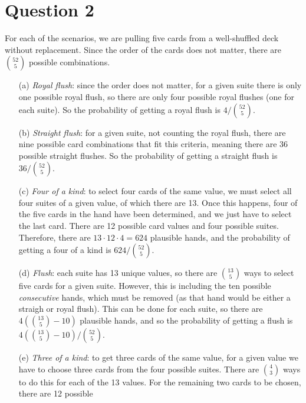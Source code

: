 \documentclass[10pt]{article}
\begin{document}
\section{Question 2} \noindent
For each of the scenarios, we are pulling five cards from a well-shuffled deck without replacement. Since the order of the cards does 
not matter, there are \(\binom{52}{5}\) possible combinations. 
\begin{itemize}
    \item[(a)] \textsl{Royal flush}: since the order does not matter, for a given suite there is only one possible royal flush, so there are 
    only four possible royal flushes (one for each suite). So the probability of getting a royal flush is \(4 / \binom{52}{5}\).
    \item[(b)] \textsl{Straight flush}: for a given suite, not counting the royal flush, there are nine possible card combinations that fit 
    this criteria, meaning there are 36 possible straight flushes. So the probability of getting a straight flush is \(36 / \binom{52}{5}\).
    \item[(c)] \textsl{Four of a kind}: to select four cards of the same value, we must select all four suites of a given value, of which there
    are 13. Once this happens, four of the five cards in the hand have been determined, and we just have to select the last card. There are 12 
    possible card values and four possible suites. Therefore, there are \(13\cdot12\cdot4 = 624\) plausible hands, and the probability of getting 
    a four of a kind is \(624 / \binom{52}{5}\).
    \item[(d)] \textsl{Flush}: each suite has 13 unique values, so there are \(\binom{13}{5}\) ways to select five cards for a given suite. 
    However, this is including the ten possible \textit{consecutive} hands, which must be removed (as that hand would be either a straigh or 
    royal flush). This can be done for each suite, so there are \(4 \left( \binom{13}{5} - 10 \right)\) plausible hands, and so the probability 
    of getting a flush is \(4 \left( \binom{13}{5} - 10 \right) / \binom{52}{5}\).
    \item[(e)] \textsl{Three of a kind}: to get three cards of the same value, for a given value we have to choose three cards from the four possible
    suites. There are \(\binom{4}{3}\) ways to do this for each of the 13 values. For the remaining two cards to be chosen, there are 12 possible 

\end{itemize}
\end{document}
